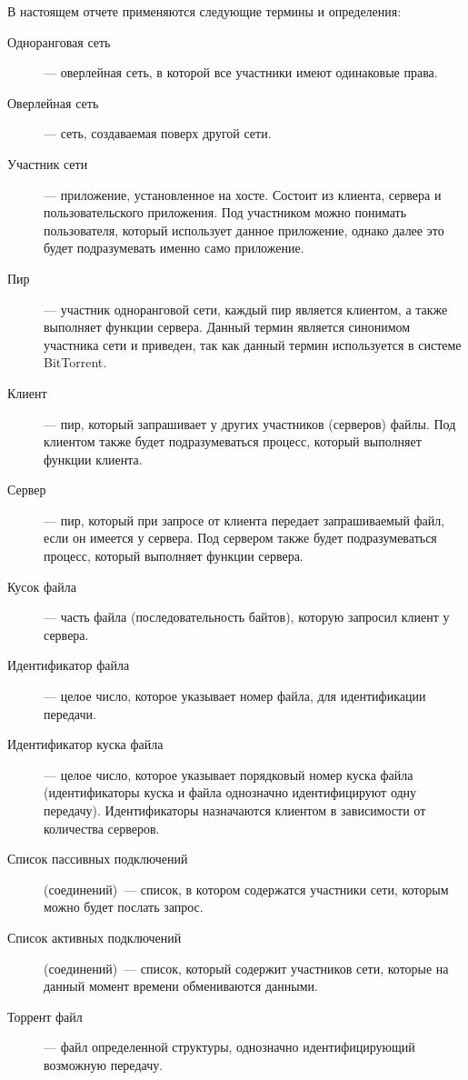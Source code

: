 В настоящем отчете применяются следующие термины и определения:
\begin{description}
    \item[Одноранговая сеть]--- оверлейная сеть, в которой все участники имеют
        одинаковые права.
    \item[Оверлейная сеть]--- сеть, создаваемая поверх другой сети.
    \item[Участник сети]--- приложение, установленное на хосте. Состоит из клиента,
        сервера и пользовательского приложения. Под участником можно понимать
        пользователя, который использует данное приложение, однако далее это будет
        подразумевать именно само приложение.
    \item[Пир]--- участник одноранговой сети, каждый пир является клиентом, а также
        выполняет функции сервера. Данный термин является синонимом участника
        сети и приведен, так как данный термин используется в системе BitTorrent.
    \item[Клиент]--- пир, который запрашивает у других участников (серверов) файлы.
        Под клиентом также будет подразумеваться процесс, который выполняет
        функции клиента.
    \item[Сервер]--- пир, который при запросе от клиента передает запрашиваемый
        файл, если он имеется у сервера. Под сервером также будет подразумеваться
        процесс, который выполняет функции сервера.
    \item[Кусок файла]--- часть файла (последовательность байтов), которую запросил
        клиент у сервера.
    \item[Идентификатор файла]--- целое число, которое указывает номер файла, для
        идентификации передачи.
    \item[Идентификатор куска файла]--- целое число, которое указывает порядковый
        номер куска файла (идентификаторы куска и файла однозначно
        идентифицируют одну передачу). Идентификаторы назначаются клиентом в
        зависимости от количества серверов.
    \item[Список пассивных подключений] (соединений)~--- список, в котором
        содержатся участники сети, которым можно будет послать запрос.
    \item[Список активных подключений] (соединений)~--- список, который содержит
        участников сети, которые на данный момент времени обмениваются
        данными.
    \item[Торрент файл]--- файл определенной структуры, однозначно идентифицирующий возможную передачу.

\end{description}
